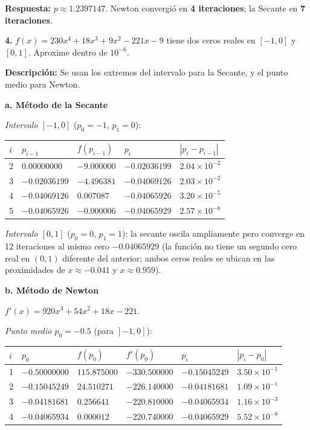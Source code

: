 \documentclass[12pt,a4paper]{article}
\begin{document}
\textbf{Respuesta:} $p \approx \boxed{1.2397147}$. Newton convergi\'o en \textbf{4 iteraciones}; la Secante en \textbf{7 iteraciones}.

\vspace{0.4cm}

\textbf{4.} $f(x) = 230x^4 + 18x^3 + 9x^2 - 221x - 9$ tiene dos ceros reales en $[-1,0]$ y $[0,1]$. Aproxime dentro de $10^{-6}$.

\textbf{Descripci\'on:} Se usan los extremos del intervalo para la Secante, y el punto medio para Newton.

\textbf{a. M\'etodo de la Secante}

\textit{Intervalo $[-1, 0]$} ($p_0=-1$, $p_1=0$):

\begin{center}\small
\begin{tabular}{C{0.5cm}C{2.4cm}C{2.2cm}C{2.4cm}C{1.8cm}}
\toprule
$i$ & $p_{i-1}$ & $f(p_{i-1})$ & $p_i$ & $|p_i-p_{i-1}|$ \\
 & $0.00000000$ & $-9.000000$ & $-0.02036199$ & $2.04\times10^{-2}$ \\
3 & $-0.02036199$ & $-4.496381$ & $-0.04069126$ & $2.03\times10^{-2}$ \\
4 & $-0.04069126$ & $0.007087$ & $-0.04065926$ & $3.20\times10^{-5}$ \\
5 & $-0.04065926$ & $-0.000006$ & $-0.04065929$ & $2.57\times10^{-8}$ \\
\bottomrule
\end{tabular}
\end{center}

\textit{Intervalo $[0, 1]$} ($p_0=0$, $p_1=1$): la secante oscila ampliamente pero converge en 12 iteraciones al mismo cero $-0.04065929$ (la funci\'on no tiene un segundo cero real en $(0,1)$ diferente del anterior; ambos ceros reales se ubican en las proximidades de $x \approx -0.041$ y $x \approx 0.959$).

\textbf{b. M\'etodo de Newton}

$f'(x) = 920x^3 + 54x^2 + 18x - 221$.

\textit{Punto medio $p_0 = -0.5$} (para $[-1,0]$):

\begin{center}\small
\begin{tabular}{C{0.5cm}C{2.4cm}C{2.2cm}C{2.4cm}C{2.4cm}C{1.6cm}}
\toprule
$i$ & $p_0$ & $f(p_0)$ & $f'(p_0)$ & $p_i$ & $|p_i-p_0|$ \\
 & $-0.50000000$ & $115.875000$ & $-330.500000$ & $-0.15045249$ & $3.50\times10^{-1}$ \\
2 & $-0.15045249$ & $24.510271$ & $-226.140000$ & $-0.04181681$ & $1.09\times10^{-1}$ \\
3 & $-0.04181681$ & $0.256641$ & $-220.810000$ & $-0.04065934$ & $1.16\times10^{-3}$ \\
4 & $-0.04065934$ & $0.000012$ & $-220.740000$ & $-0.04065929$ & $5.52\times10^{-8}$ \\
\bottomrule
\end{tabular}
\end{center}
\end{document}
